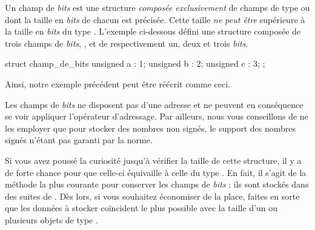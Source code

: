 Un champ de \emph{bits} est une structure \emph{composée exclusivement}
de champs de type  ou  dont la taille
en \emph{bits} de chacun est précisée. Cette taille \emph{ne peut être}
supérieure à la taille en \emph{bits} du type . L'exemple
ci-dessous défini une structure composée de trois champs de \emph{bits},
,  et  de respectivement un, deux et trois
\emph{bits}.

\begin{C}
struct champ_de_bits
{
    unsigned a : 1;
    unsigned b : 2;
    unsigned c : 3;
};
\end{C}

Ainsi, notre exemple précédent peut être réécrit comme ceci.


\begin{erreurbox}
  Les champs de \emph{bits} ne disposent pas
d'une adresse et ne peuvent en conséquence se voir appliquer l'opérateur
d'adressage. Par ailleurs, nous vous conseillons de ne les employer que
pour stocker des nombres non signés, le support des nombres signés
n'étant pas garanti par la norme.
\end{erreurbox}


Si vous avez poussé la curiosité jusqu'à vérifier la taille de cette
structure, il y a de forte chance pour que celle-ci équivaille à celle
du type . En fait, il s'agit de la méthode la plus courante
pour conserver les champs de \emph{bits} : ils sont stockés dans des
suites de . Dès lors, si vous souhaitez économiser de la
place, faites en sorte que les données à stocker coïncident le plus
possible avec la taille d'un ou plusieurs objets de type .

